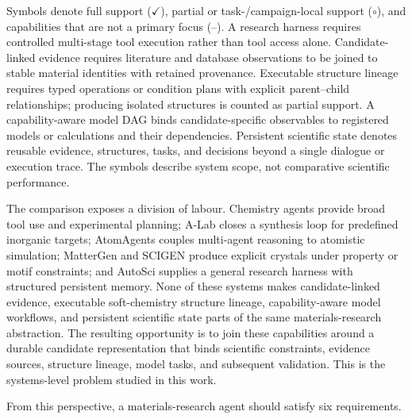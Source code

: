 \documentclass[11pt]{article}
\newcommand{\fullsupport}{\ensuremath{\checkmark}}
\newcommand{\partialsupport}{\ensuremath{\circ}}
\newcommand{\notsupport}{--}
\begin{document}
\begin{table}[t]
    \begin{minipage}{0.98\linewidth}
        \footnotesize
        Symbols denote full support (\fullsupport), partial or task-/campaign-local support (\partialsupport), and capabilities that are not a primary focus (\notsupport). A research harness requires controlled multi-stage tool execution rather than tool access alone. Candidate-linked evidence requires literature and database observations to be joined to stable material identities with retained provenance. Executable structure lineage requires typed operations or condition plans with explicit parent--child relationships; producing isolated structures is counted as partial support. A capability-aware model DAG binds candidate-specific observables to registered models or calculations and their dependencies. Persistent scientific state denotes reusable evidence, structures, tasks, and decisions beyond a single dialogue or execution trace. The symbols describe system scope, not comparative scientific performance.
    \end{minipage}
\end{table}

The comparison exposes a division of labour. Chemistry agents provide broad tool use and experimental planning; A-Lab closes a synthesis loop for predefined inorganic targets; AtomAgents couples multi-agent reasoning to atomistic simulation; MatterGen and SCIGEN produce explicit crystals under property or motif constraints; and AutoSci supplies a general research harness with structured persistent memory. None of these systems makes candidate-linked evidence, executable soft-chemistry structure lineage, capability-aware model workflows, and persistent scientific state parts of the same materials-research abstraction. The resulting opportunity is to join these capabilities around a durable candidate representation that binds scientific constraints, evidence sources, structure lineage, model tasks, and subsequent validation. This is the systems-level problem studied in this work.

From this perspective, a materials-research agent should satisfy six requirements.
\end{document}
